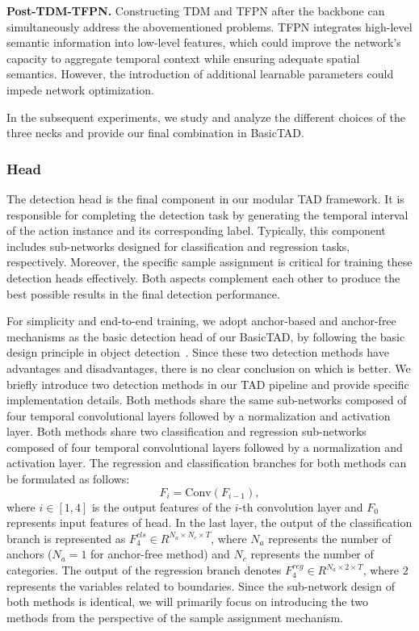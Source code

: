 \documentclass[a4paper,fleqn]{cas-dc}
\begin{document}
\textbf{Post-TDM-TFPN.} 
Constructing TDM and TFPN after the backbone can simultaneously address the abovementioned problems. TFPN integrates high-level semantic information into low-level features, which could improve the network's capacity to aggregate temporal context while ensuring adequate spatial semantics. 
However, the introduction of additional learnable parameters could impede network optimization.  

In the subsequent experiments, we study and analyze the different choices of the three necks and provide our final combination in BasicTAD.


\subsubsection{Head}
\label{sec:label}
The detection head is the final component in our modular TAD framework. It is responsible for completing the detection task by generating the temporal interval of the action instance and its corresponding label. Typically, this component includes sub-networks designed for classification and regression tasks, respectively. Moreover, the specific sample assignment is critical for training these detection heads effectively. 
Both aspects complement each other to produce the best possible results in the final detection performance.

For simplicity and end-to-end training, we adopt anchor-based and anchor-free mechanisms as the basic detection head of our BasicTAD, by following the basic design principle in object detection~\citep{faster-rcnn,retina,fcos}.
Since these two detection methods have advantages and disadvantages, there is no clear conclusion on which is better. 
We briefly introduce two detection methods in our TAD pipeline and provide specific implementation details. Both methods share the same sub-networks composed of four temporal convolutional layers followed by a normalization and activation layer. Both methods share two classification and regression sub-networks composed of four temporal convolutional layers followed by a normalization and activation layer.
The regression and classification branches for both methods can be formulated as follows:
\begin{equation}
    F_{i}=\text{Conv}(F_{i-1}),
\end{equation}
where $i \in [1,4]$ is the output features of the $i$-th convolution layer and $F_{0}$ represents input features of head. 
In the last layer, the output of the classification branch is represented as $F_{4}^{cls} \in R^{N_a \times N_c \times T}$, where $N_a$ represents the number of anchors ($N_a = 1$ for anchor-free method) and $N_c$ represents the number of categories. The output of the regression branch denotes $F_{4}^{reg} \in R^{N_a \times 2 \times T}$, where $2$ represents the variables related to boundaries.
Since the sub-network design of both methods is identical, we will primarily focus on introducing the two methods from the perspective of the sample assignment mechanism.
\end{document}
